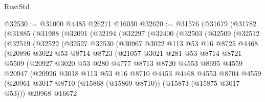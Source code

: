 \begin{lexlean}{RustStd}
\begin{coremodule}
@32530 := @31000 @4485 @26271 @16030
@32620 := @31576
    (@31679
      (@31782
        (@31885
          (@31988
            (@32091
              (@32194
                (@32297
                  (@32400
                    (@32503
                      (@32509
                        (@32512
                          (@32519
                            (@32522
                              (@32527
                                @32530
                                (@30967
                                  @3022
                                  @113
                                  @53
                                  @16
                                  @8725
                                  @4468
                                  (@20896
                                    @3022
                                    @53
                                    @8714
                                    @8723
                                    (@21057
                                      @3021
                                      @281
                                      @53
                                      @8714
                                      @8721
                                      @5509
                                      (@20927
                                        @3020
                                        @53
                                        @280
                                        @4777
                                        @8713
                                        @8720
                                        @4553
                                        @8695
                                        @4559
                                        @20947
                                        (@20926
                                          @3018
                                          @113
                                          @53
                                          @16
                                          @8710
                                          @4453
                                          @4468
                                          @4553
                                          @8704
                                          @4559
                                          (@20961
                                            @3017
                                            @8710
                                            (@15868 (@15869 @8710))
                                            (@15873 (@15875 @3017 @53)))
                                          @20968
                                          @16672

\end{coremodule}
\end{lexlean}
